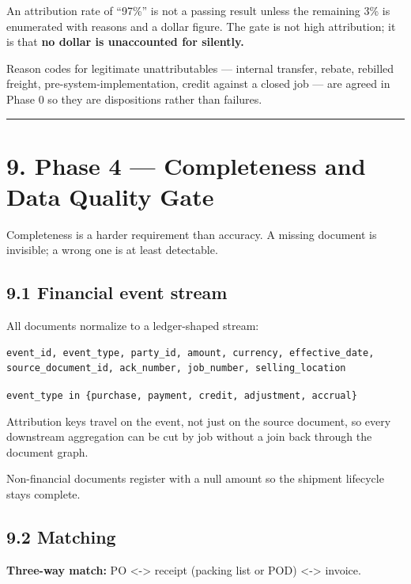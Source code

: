 \documentclass[
]{article}
\begin{document}
An attribution rate of ``97\%'' is not a passing result unless the
remaining 3\% is enumerated with reasons and a dollar figure. The gate
is not high attribution; it is that \textbf{no dollar is unaccounted for
silently.}

Reason codes for legitimate unattributables --- internal transfer,
rebate, rebilled freight, pre-system-implementation, credit against a
closed job --- are agreed in Phase 0 so they are dispositions rather
than failures.

\begin{center}\rule{0.5\linewidth}{0.5pt}\end{center}

\section{9. Phase 4 --- Completeness and Data Quality
Gate}\label{phase-4-completeness-and-data-quality-gate}

Completeness is a harder requirement than accuracy. A missing document
is invisible; a wrong one is at least detectable.

\subsection{9.1 Financial event stream}\label{financial-event-stream}

All documents normalize to a ledger-shaped stream:

\begin{verbatim}
event_id, event_type, party_id, amount, currency, effective_date,
source_document_id, ack_number, job_number, selling_location
\end{verbatim}

\texttt{event\_\allowbreak{}type in \{purchase, payment, credit, adjustment, accrual\}}

Attribution keys travel on the event, not just on the source document,
so every downstream aggregation can be cut by job without a join back
through the document graph.

Non-financial documents register with a null amount so the shipment
lifecycle stays complete.

\subsection{9.2 Matching}\label{matching}

\textbf{Three-way match:} PO \textless-\textgreater{} receipt (packing
list or POD) \textless-\textgreater{} invoice.
\end{document}
